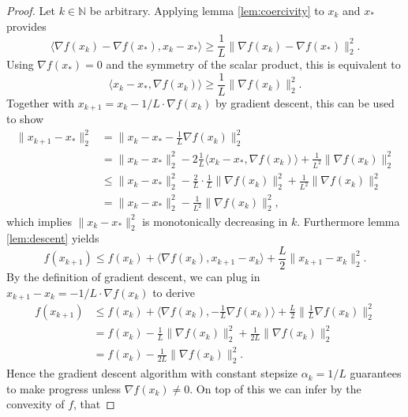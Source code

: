 \documentclass[11pt, a4paper]{article}
\newcommand{\N}{\mathds{N}}
\begin{document}
\begin{proof}
Let $k \in \N$ be arbitrary. Applying lemma \ref{lem:coercivity} to $x_k$ and $x_*$ provides
\[ \big \langle \nabla f(x_k) - \nabla f(x_*), x_k - x_* \big \rangle \ge \frac{1}{L} \big \| \nabla f(x_k) - \nabla f(x_*) \big \|_2^2. \]
Using $\nabla f(x_*) = 0$ and the symmetry of the scalar product, this is equivalent to
\[ \big \langle x_k - x_* ,\nabla f(x_k) \big \rangle \ge \frac{1}{L} \big \| \nabla f(x_k) \big \|_2^2. \]
Together with $x_{k+1} = x_k - 1/L \cdot \nabla f(x_k)$ by gradient descent, this can be used to show
\begin{equation} \begin{split}
\big \| x_{k+1} - x_* \big \|_2^2
&= \big \| x_k - x_* - \frac{1}{L} \nabla f(x_k) \big \|_2^2 \\\
&= \big \| x_k - x_* \big \|_2^2 - 2 \frac{1}{L} \big \langle x_k - x_* , \nabla f(x_k) \big \rangle + \frac{1}{L^2} \big \| \nabla f(x_k) \big \|_2^2 \\\
&\leq \big \| x_k - x_* \big \|_2^2 - \frac{2}{L} \cdot \frac{1}{L} \big \| \nabla f(x_k) \big \|_2^2 + \frac{1}{L^2} \big \| \nabla f(x_k) \big \|_2^2 \\\
& = \big \| x_k - x_* \big \|_2^2 - \frac{1}{L^2} \big \| \nabla f(x_k) \big \|_2^2,
\end{split} \end{equation}
which implies $\big \| x_{k} - x_* \big \|_2^2$ is monotonically decreasing in $k$. Furthermore lemma \ref{lem:descent} yields
\[  f(x_{k+1}) \leq f(x_k) + \big \langle \nabla f(x_k) , x_{k+1} -x_k \big \rangle + \frac{L}{2} \big \| x_{k+1} - x_k \big \|_2^2. \]
By the definition of gradient descent, we can plug in $x_{k+1} - x_k = - 1/L \cdot \nabla f(x_k)$ to derive
\begin{equation} \begin{split} 
f(x_{k+1}) 
&\leq f(x_k) + \big \langle \nabla f(x_k) , - \frac{1}{L} \nabla f(x_k) \big \rangle + \frac{L}{2} \big \| \frac{1}{L} \nabla f(x_k) \big \|_2^2 \\\
&= f(x_k) - \frac{1}{L} \big \| \nabla f(x_k) \big \|_2^2 + \frac{1}{2L} \big \| \nabla f(x_k) \big \|_2^2 \\\
&= f(x_k) - \frac{1}{2L} \big \| \nabla f(x_k) \big \|_2^2.
\end{split} \end{equation}
Hence the gradient descent algorithm with constant stepsize $\alpha_k = 1/L$ guarantees to make progress unless $\nabla f(x_k) \neq 0$. On top of this we can infer by the convexity of $f$, that

\end{proof}
\end{document}

